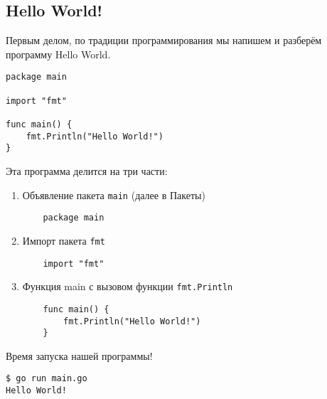 \subsection{Hello World!}
Первым делом, по традиции программирования мы напишем и разберём программу Hello World.
\begin{verbatim}
package main

import "fmt"

func main() {
    fmt.Println("Hello World!")
}
\end{verbatim}

Эта программа делится на три части:
\begin{enumerate}
    \item Объявление пакета \verb|main| (далее в Пакеты)
    \begin{verbatim}
    package main
    \end{verbatim}

    \item Импорт пакета \verb|fmt|
    \begin{verbatim}
    import "fmt"
    \end{verbatim}

    \item Функция main с вызовом функции \verb|fmt.Println|
    \begin{verbatim}
    func main() {
        fmt.Println("Hello World!")
    }
    \end{verbatim}
\end{enumerate}

Время запуска нашей программы!
\begin{verbatim}
$ go run main.go
Hello World!
\end{verbatim}
